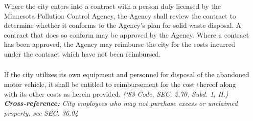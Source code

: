 \subsubsection{}
Where the city enters into a contract with a person duly licensed by the Minnesota Pollution Control Agency, the Agency shall review the contract to determine whether it conforms to the Agency’s plan for solid waste disposal.  A contract that does so conform may be approved by the Agency.  Where a contract has been approved, the Agency may reimburse the city for the costs incurred under the contract which have not been reimbursed.
\subsubsection{}
If the city utilizes its own equipment and personnel for disposal of the abandoned motor vehicle, it shall be entitled to reimbursement for the cost thereof along with its other costs as herein provided.\newline
\emph{(‘83 Code, SEC. 2.70, Subd. 1, H.)}\\
\emph{\textbf{Cross-reference:} City employees who may not purchase excess or unclaimed property, see SEC. 36.04}

%
